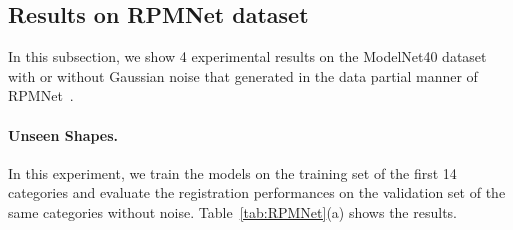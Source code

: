 \documentclass[10pt,twocolumn,letterpaper]{article}
\begin{document}
\subsection{Results on RPMNet dataset}
\label{sec:3.3}
In this subsection, we show 4 experimental results on the ModelNet40 dataset with or without Gaussian noise that generated in the data partial manner of RPMNet~\cite{yew2020-RPMNet}.
\begin{table}[t]
    \setlength\tabcolsep{2.5pt} 
\caption{Speed comparison for registering a point cloud pair of various sizes (in milliseconds). The missing result in the table is due to the limitation in GPU memory.}
    \vspace{-0.37cm}
    \label{tab:inference time}
\end{table} \vspace{-0.3cm}
\paragraph{Unseen Shapes.}
In this experiment, we train the models on the training set of the first 14 categories and evaluate the registration performances on the validation set of the same categories without noise. Table~\ref{tab:RPMNet}(a) shows the results. 
\end{document}
